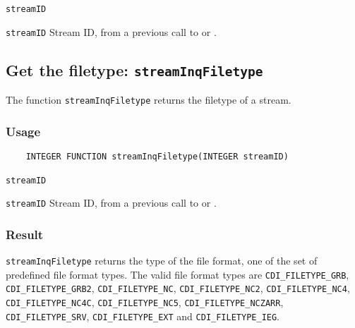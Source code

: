 \hspace*{4mm}\begin{minipage}[]{15cm}
\begin{deflist}{\texttt{streamID}\ }
\item[\texttt{streamID}]
Stream ID, from a previous call to {} or {}.

\end{deflist}
\end{minipage}


\subsection{Get the filetype: \texttt{streamInqFiletype}}
\label{streamInqFiletype}

The function {\texttt{streamInqFiletype}} returns the filetype of a stream.

\subsubsection*{Usage}

\begin{verbatim}
    INTEGER FUNCTION streamInqFiletype(INTEGER streamID)
\end{verbatim}

\hspace*{4mm}\begin{minipage}[]{15cm}
\begin{deflist}{\texttt{streamID}\ }
\item[\texttt{streamID}]
Stream ID, from a previous call to {} or {}.

\end{deflist}
\end{minipage}

\subsubsection*{Result}

{\texttt{streamInqFiletype}} returns the type of the file format,
one of the set of predefined {\CDI} file format types.
The valid {\CDI} file format types are {\texttt{CDI\_FILETYPE\_GRB}}, {\texttt{CDI\_FILETYPE\_GRB2}}, {\texttt{CDI\_FILETYPE\_NC}},
{\texttt{CDI\_FILETYPE\_NC2}}, {\texttt{CDI\_FILETYPE\_NC4}}, {\texttt{CDI\_FILETYPE\_NC4C}}, {\texttt{CDI\_FILETYPE\_NC5}},
{\texttt{CDI\_FILETYPE\_NCZARR}}, {\texttt{CDI\_FILETYPE\_SRV}}, {\texttt{CDI\_FILETYPE\_EXT}} and {\texttt{CDI\_FILETYPE\_IEG}}.


